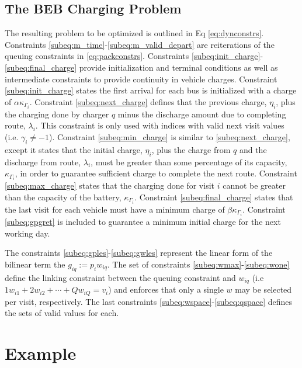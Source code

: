 \documentclass[letterpaper, 10pt, conference]{IEEEtran}
\begin{document}
\subsection{The BEB Charging Problem} \label{sec:BEB_MILP}
The resulting problem to be optimized is outlined in Eq \ref{eq:dynconstrs}. Constraints
\eqref{subeq:m_time}-\eqref{subeq:m_valid_depart} are reiterations of the queuing constraints in \eqref{eq:packconstrs}.
Constraints \eqref{subeq:init_charge}-\eqref{subeq:final_charge} provide initialization and terminal conditions as well
as intermediate constraints to provide continuity in vehicle charges. Constraint \eqref{subeq:init_charge} states the
first arrival for each bus is initialized with a charge of $\alpha \kappa_{\Gamma_i}$. Constraint \eqref{subeq:next_charge} defines
that the previous charge, $\eta_i$, plus the charging done by charger $q$ minus the discharge amount due to completing
route, $\lambda_i$. This constraint is only used with indices with valid next visit values (i.e. $\gamma_i \neq -1$). Constraint
\eqref{subeq:min_charge} is similar to \eqref{subeq:next_charge}, except it states that the initial charge, $\eta_i$, plus
the charge from $q$ and the discharge from route, $\lambda_i$, must be greater than some percentage of its capacity,
$\kappa_{\Gamma_i}$, in order to guarantee sufficient charge to complete the next route. Constraint \eqref{subeq:max_charge}
states that the charging done for visit $i$ cannot be greater than the capacity of the battery, $\kappa_{\Gamma_i}$. Constraint
\eqref{subeq:final_charge} states that the last visit for each vehicle must have a minimum charge of $\beta \kappa_{\Gamma_i}$.
Constraint \eqref{subeq:gpgret} is included to guarantee a minimum initial charge for the next working day.

The constraints \eqref{subeq:gples}-\eqref{subeq:gwles} represent the linear form of the bilinear term the $g_{iq} :=
p_i w_{iq}$. The set of constraints \eqref{subeq:wmax}-\eqref{subeq:wone} define the linking constraint between the
queuing constraint and $w_{iq}$ (i.e $1w_{i1} + 2w_{i2} + \cdots + Qw_{iQ} = v_i$) and enforces that only a single $w$ may be
selected per visit, respectively. The last constraints \eqref{subeq:wspace}-\eqref{subeq:qspace} defines the sets of
valid values for each.



\section{Example}
\label{sec:example}
\end{document}
